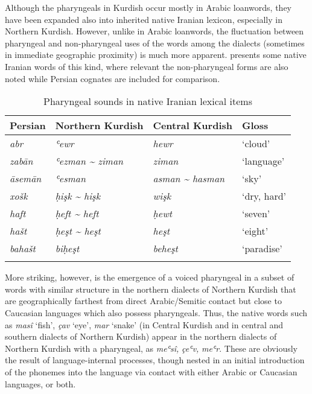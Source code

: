 \documentclass[output=paper]{langsci/langscibook}
\begin{document}
Although the pharyngeals in Kurdish occur mostly in Arabic loanwords, they have been expanded also into inherited native Iranian lexicon, especially in Northern Kurdish. However, unlike in Arabic loanwords, the fluctuation between pharyngeal and non-pharyngeal uses of the words among the dialects (sometimes in immediate geographic proximity) is much more apparent.  presents some native Iranian words of this kind, where relevant the non-pharyngeal forms are also noted while Persian cognates are included for comparison.  

\begin{table}
\begin{tabular}{llll}
\lsptoprule
{Persian} & {Northern Kurdish} & {Central Kurdish} & {Gloss}\\\midrule
\textit{abr} & \textit{ʿewr} & \textit{hewr} & ‘cloud’\\
\textit{zabān} & \textit{ʿezman {\textasciitilde} ziman} & \textit{ziman} & ‘language’\\
\textit{āsemān} & \textit{ʿesman} & \textit{asman {\textasciitilde} hasman} & ‘sky’\\
\textit{xošk} & \textit{ḥişk {\textasciitilde} hişk}  & \textit{wişk} & ‘dry, hard’\\
\textit{haft} & \textit{ḥeft {\textasciitilde} heft} & \textit{ḥewt}  & ‘seven’\\
\textit{hašt} & \textit{ḥeşt {\textasciitilde} heşt} & \textit{heşt} & ‘eight’\\
\textit{bahašt} & \textit{biḥeşt} & \textit{beheşt} & ‘paradise’\\
\lspbottomrule
\end{tabular}
\caption{\label{bkm:Ref14705119}Pharyngeal sounds in native Iranian lexical items}
\end{table}

More striking, however, is the emergence of a voiced pharyngeal in a subset of words with similar structure in the northern dialects of Northern Kurdish that are geographically farthest from direct Arabic/Semitic contact but close to Caucasian languages which also possess pharyngeals. Thus, the native words such as \textit{masî} ‘fish’, \textit{çav} ‘eye’, \textit{mar} ‘snake’ (in Central Kurdish and in central and southern dialects of Northern Kurdish) appear in the northern dialects of Northern Kurdish with a pharyngeal, as \textit{meʿsî,} \textit{çeʿv,} \textit{meʿr}. These are obviously the result of language-internal processes, though nested in an initial introduction of the phonemes into the language via contact with either Arabic or Caucasian languages, or both.
\end{document}
